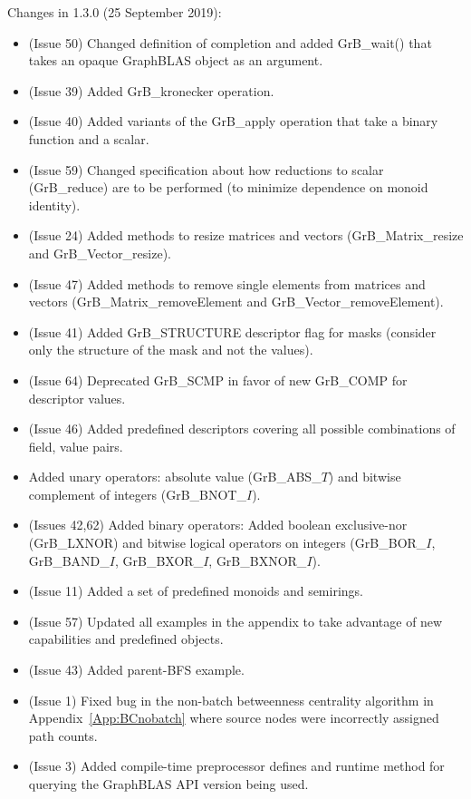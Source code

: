 Changes in 1.3.0 (25 September 2019):
\begin{itemize}
\item (Issue 50) Changed definition of completion and added {\sf GrB\_wait()} that takes an opaque GraphBLAS object as an argument.
\item (Issue 39) Added {\sf GrB\_kronecker} operation.
\item (Issue 40) Added variants of the {\sf GrB\_apply} operation that take a binary function and a scalar.
\item (Issue 59) Changed specification about how reductions to scalar ({\sf GrB\_reduce}) are to be performed (to minimize dependence on monoid identity).
\item (Issue 24) Added methods to resize matrices and vectors ({\sf GrB\_Matrix\_resize} and {\sf GrB\_Vector\_resize}).
\item (Issue 47) Added methods to remove single elements from matrices and vectors ({\sf GrB\_Matrix\_removeElement} and {\sf GrB\_Vector\_removeElement}).
\item (Issue 41) Added {\sf GrB\_STRUCTURE} descriptor flag for masks (consider only the structure of the mask and not the values).
\item (Issue 64) Deprecated {\sf GrB\_SCMP} in favor of new {\sf GrB\_COMP} for descriptor values.
\item (Issue 46) Added predefined descriptors covering all possible combinations of field, value pairs.
\item Added unary operators: absolute value ({\sf GrB\_ABS\_$T$}) and bitwise complement of integers ({\sf GrB\_BNOT\_$I$}). 
\item (Issues 42,62) Added binary operators: Added boolean exclusive-nor ({\sf GrB\_LXNOR}) and bitwise logical operators on integers ({\sf GrB\_BOR\_$I$}, {\sf GrB\_BAND\_$I$}, {\sf GrB\_BXOR\_$I$}, {\sf GrB\_BXNOR\_$I$}).
\item (Issue 11) Added a set of predefined monoids and semirings.
\item (Issue 57) Updated all examples in the appendix to take advantage of new capabilities and predefined objects.
\item (Issue 43) Added parent-BFS example.
\item (Issue 1) Fixed bug in the non-batch betweenness centrality algorithm in 
Appendix~\ref{App:BCnobatch} where source nodes were incorrectly assigned path counts.
\item (Issue 3) Added compile-time preprocessor defines and runtime method for querying the GraphBLAS API version being used.

\end{itemize}
